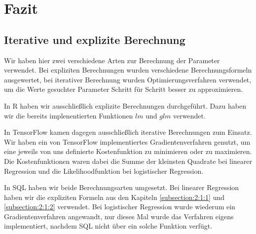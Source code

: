 \chapter{Fazit}

\section{Iterative und explizite Berechnung}
\label{section:6:1}

Wir haben hier zwei verschiedene Arten zur Berechnung der Parameter verwendet. Bei expliziten Berechnungen wurden verschiedene Berechnungsformeln ausgewertet, bei iterativer Berechnung wurden Optimierungsverfahren verwendet, um die Werte gesuchter Parameter Schritt für Schritt besser zu approximieren.

In R haben wir ausschließlich explizite Berechnungen durchgeführt. Dazu haben wir die bereits implenentierten Funktionen $lm$ und $glm$ verwendet.

In TensorFlow kamen dagegen ausschließlich iterative Berechnungen zum Einsatz. Wir haben ein von TensorFlow implementiertes Gradientenverfahren genutzt, um eine jeweils von uns definierte Kostenfunktion zu minimieren oder zu maximieren. Die Kostenfunktionen waren dabei die Summe der kleinsten Quadrate bei linearer Regression und die Likelihoodfunktion bei logistischer Regression.

In SQL haben wir beide Berechnungsarten umgesetzt. Bei linearer Regression haben wir die expliziten Formeln aus den Kapiteln \ref{subsection:2:1:1} und \ref{subsection:2:1:2} verwendet. Bei logistischer Regression wurde wiederum ein Gradientenverfahren angewandt, nur dieses Mal wurde das Verfahren eigens implementiert, nachdem SQL nicht über ein solche Funktion verfügt.
